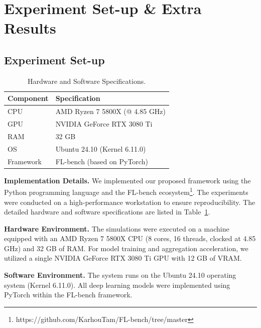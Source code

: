 \section{Experiment Set-up \& Extra Results}
\label{app:setup}
\subsection*{Experiment Set-up}
\begin{table}[htbp]
    \centering
    \caption{Hardware and Software Specifications.}
    \label{tab:system_specs}
    \begin{tabular}{ll}
        \toprule
        \textbf{Component} & \textbf{Specification} \\
        \midrule
        CPU & AMD Ryzen 7 5800X (@ 4.85 GHz) \\
        GPU & NVIDIA GeForce RTX 3080 Ti \\
        RAM & 32 GB \\
        OS & Ubuntu 24.10 (Kernel 6.11.0) \\
        Framework & FL-bench (based on PyTorch) \\
        \bottomrule
    \end{tabular}
\end{table}    
\label{subsec:setup}
\noindent\textbf{Implementation Details.} 
We implemented our proposed framework using the Python programming language and the FL-bench ecosystem\footnote{https://github.com/KarhouTam/FL-bench/tree/master}. The experiments were conducted on a high-performance workstation to ensure reproducibility. The detailed hardware and software specifications are listed in Table~\ref{tab:system_specs}.

\noindent\textbf{Hardware Environment.} 
The simulations were executed on a machine equipped with an AMD Ryzen 7 5800X CPU (8 cores, 16 threads, clocked at 4.85 GHz) and 32 GB of RAM. For model training and aggregation acceleration, we utilized a single NVIDIA GeForce RTX 3080 Ti GPU with 12 GB of VRAM.

\noindent\textbf{Software Environment.} 
The system runs on the Ubuntu 24.10 operating system (Kernel 6.11.0). All deep learning models were implemented using PyTorch within the FL-bench framework.


